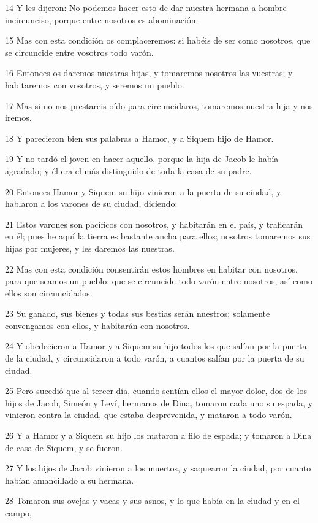 14 Y les dijeron: No podemos hacer esto de dar nuestra hermana a hombre incircunciso, porque entre nosotros es abominación.

15 Mas con esta condición os complaceremos: si habéis de ser como nosotros, que se circuncide entre vosotros todo varón.

16 Entonces os daremos nuestras hijas, y tomaremos nosotros las vuestras; y habitaremos con vosotros, y seremos un pueblo.

17 Mas si no nos prestareis oído para circuncidaros, tomaremos nuestra hija y nos iremos.

18 Y parecieron bien sus palabras a Hamor, y a Siquem hijo de Hamor.

19 Y no tardó el joven en hacer aquello, porque la hija de Jacob le había agradado; y él era el más distinguido de toda la casa de su padre.

20 Entonces Hamor y Siquem su hijo vinieron a la puerta de su ciudad, y hablaron a los varones de su ciudad, diciendo:

21 Estos varones son pacíficos con nosotros, y habitarán en el país, y traficarán en él; pues he aquí la tierra es bastante ancha para ellos; nosotros tomaremos sus hijas por mujeres, y les daremos las nuestras.

22 Mas con esta condición consentirán estos hombres en habitar con nosotros, para que seamos un pueblo: que se circuncide todo varón entre nosotros, así como ellos son circuncidados.

23 Su ganado, sus bienes y todas sus bestias serán nuestros; solamente convengamos con ellos, y habitarán con nosotros.

24 Y obedecieron a Hamor y a Siquem su hijo todos los que salían por la puerta de la ciudad, y circuncidaron a todo varón, a cuantos salían por la puerta de su ciudad.

25 Pero sucedió que al tercer día, cuando sentían ellos el mayor dolor, dos de los hijos de Jacob, Simeón y Leví, hermanos de Dina, tomaron cada uno su espada, y vinieron contra la ciudad, que estaba desprevenida, y mataron a todo varón.

26 Y a Hamor y a Siquem su hijo los mataron a filo de espada; y tomaron a Dina de casa de Siquem, y se fueron.

27 Y los hijos de Jacob vinieron a los muertos, y saquearon la ciudad, por cuanto habían amancillado a su hermana.

28 Tomaron sus ovejas y vacas y sus asnos, y lo que había en la ciudad y en el campo,

